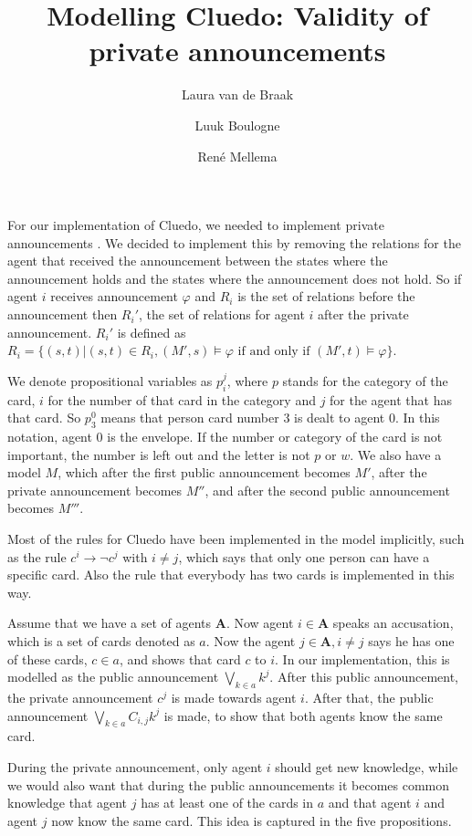 \documentclass[a4paper, 10pt]{article}
\title{Modelling Cluedo: Validity of private announcements}
\author{Laura van de Braak \and Luuk Boulogne \and Ren\'e Mellema}
\date{}
\newcommand{\impl}{\rightarrow}
\newcommand{\A}{\mathbf{A}}
\begin{document}
\maketitle

For our implementation of Cluedo, we needed to implement private
announcements \citep[see][Chapter 6]{ditmarsch2007dynamic}. We decided to
implement this by removing the relations for the agent that received the
announcement between the states where the announcement holds and the states
where the announcement does not hold. So if agent $i$ receives announcement
$\varphi$ and $R_i$ is the set of relations before the announcement then
$R_i'$, the set of relations for agent $i$ after the private announcement.
$R_i'$ is defined as $R_i = \{(s, t) | (s, t) \in R_i, (M', s) \models
\varphi \text{ if and only if } (M', t) \models \varphi\}$.

We denote propositional variables as $p_i^j$, where $p$ stands for the
category of the card, $i$ for the number of that card in the category and
$j$ for the agent that has that card. So $p_3^0$ means that person card
number 3 is dealt to agent 0. In this notation, agent 0 is the envelope.
If the number or category of the card is not important, the number is left
out and the letter is not $p$ or $w$.  We also have a model $M$, which
after the first public announcement becomes $M'$, after the private
announcement becomes $M''$, and after the second public announcement becomes
$M'''$.

Most of the rules for Cluedo have been implemented in the model implicitly,
such as the rule $c^i \impl \neg c^j$ with $i \not = j$, which says that only
one person can have a specific card. Also the rule that everybody has two
cards is implemented in this way.

Assume that we have a set of agents $\A$. Now agent $i \in \A$ speaks an
accusation, which is a set of cards denoted as $a$. Now the agent $j \in
\A, i \not = j$ says he has one of these cards, $c \in a$, and shows that
card $c$ to $i$.  In our implementation, this is modelled as the public
announcement $\bigvee_{k \in a} k^j$. After this public announcement, the
private announcement $c^j$ is made towards agent $i$. After that, the
public announcement $\bigvee_{k \in a} C_{i, j} k^j$ is made, to show that
both agents know the same card. 

During the private announcement, only agent $i$ should get new knowledge,
while we would also want that during the public announcements it becomes
common knowledge that agent $j$ has at least one of the cards in $a$ and
that agent $i$ and agent $j$ now know the same card. This idea is captured
in the five propositions.
\end{document}
